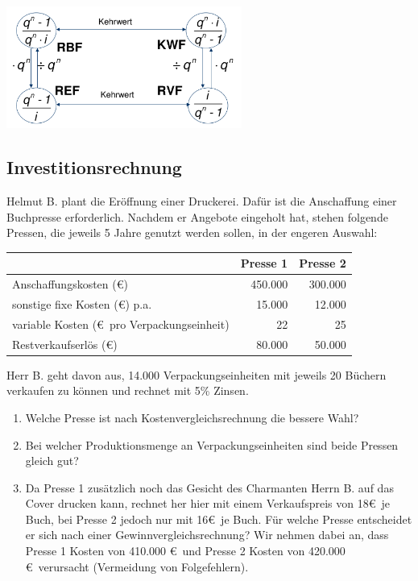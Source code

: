 \documentclass[11pt, a4paper]{article}
\begin{document}
\includegraphics[height=4cm]{RentenUndKapitalfaktoren.png}

\subsection{Investitionsrechnung}
Helmut B. plant die Eröffnung einer Druckerei. Dafür ist die Anschaffung einer Buchpresse erforderlich. Nachdem er Angebote eingeholt hat, stehen folgende Pressen, die jeweils 5 Jahre genutzt werden sollen, in der engeren Auswahl:

\vspace{\baselineskip}
\begin{tabular}{l|r|r}
	& Presse 1 & Presse 2 \\ \hline
	Anschaffungskosten (\euro) & 450.000 & 300.000 \\
	sonstige fixe Kosten (\euro) p.a. & 15.000 & 12.000 \\
	variable Kosten (\euro \ pro Verpackungseinheit) & 22 & 25 \\
	Restverkaufserlös (\euro) & 80.000 & 50.000
\end{tabular}

\vspace{\baselineskip}
Herr B. geht davon aus, 14.000 Verpackungseinheiten mit jeweils 20 Büchern verkaufen zu können und rechnet mit 5\% Zinsen.

\begin{enumerate}
	\item Welche Presse ist nach Kostenvergleichsrechnung die bessere Wahl?
	\item Bei welcher Produktionsmenge an Verpackungseinheiten sind beide Pressen gleich gut?
	\item Da Presse 1 zusätzlich noch das Gesicht des Charmanten Herrn B. auf das Cover drucken kann, rechnet her hier mit einem Verkaufspreis von 18\euro \ je Buch, bei Presse 2 jedoch nur mit 16\euro \ je Buch. Für welche Presse entscheidet er sich nach einer Gewinnvergleichsrechnung? Wir nehmen dabei an, dass Presse 1 Kosten von 410.000 \euro \ und Presse 2 Kosten von 420.000 \euro \ verursacht (Vermeidung von Folgefehlern).
\end{enumerate}
\end{document}
